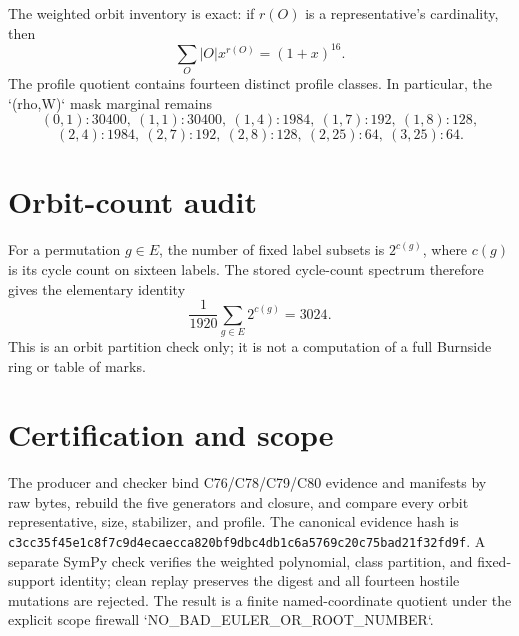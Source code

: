 \documentclass[10pt]{article}
\begin{document}
The weighted orbit inventory is exact: if $r(O)$ is a representative's
cardinality, then
\[
 \sum_O |O|x^{r(O)}=(1+x)^{16}.
\]
The profile quotient contains fourteen distinct profile classes.  In
particular, the `(rho,W)` mask marginal remains
\[
(0,1):30400,\ (1,1):30400,\ (1,4):1984,\ (1,7):192,\ (1,8):128,
\]
\[
(2,4):1984,\ (2,7):192,\ (2,8):128,\ (2,25):64,\ (3,25):64.
\]

\section{Orbit-count audit}
For a permutation $g\in E$, the number of fixed label subsets is
$2^{c(g)}$, where $c(g)$ is its cycle count on sixteen labels.  The stored
cycle-count spectrum therefore gives the elementary identity
\[
 \frac1{1920}\sum_{g\in E}2^{c(g)}=3024.
\]
This is an orbit partition check only; it is not a computation of a full
Burnside ring or table of marks.

\section{Certification and scope}
The producer and checker bind C76/C78/C79/C80 evidence and manifests by raw
bytes, rebuild the five generators and closure, and compare every orbit
representative, size, stabilizer, and profile.  The canonical evidence hash is
\texttt{c3cc35f45e1c8f7c9d4ecaecca820bf9dbc4db1c6a5769c20c75bad21f32fd9f}.
A separate SymPy check
verifies the weighted polynomial, class partition, and fixed-support identity;
clean replay preserves the digest and all fourteen hostile mutations are
rejected.  The result is a finite named-coordinate quotient under the explicit
scope firewall `NO\_BAD\_EULER\_OR\_ROOT\_NUMBER`.
\end{document}
